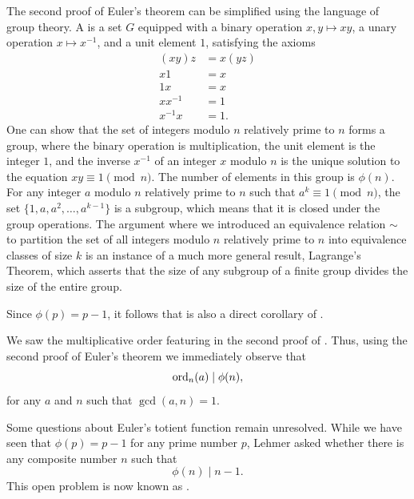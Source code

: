 \begin{remark}
  The second proof of Euler's theorem can be simplified using the language of group theory. A  is a set $G$ equipped with a binary operation $x,y\mapsto xy$, a unary operation $x\mapsto x^{-1}$, and a unit element $1$, satisfying the axioms
  \begin{align*}
    (xy)z & = x(yz) \\
    x1 & = x \\
    1x & = x \\
    xx^{-1} & = 1 \\
    x^{-1}x & = 1.
  \end{align*}
  One can show that the set of integers modulo $n$ relatively prime to $n$ forms a group, where the binary operation is multiplication, the unit element is the integer $1$, and the inverse $x^{-1}$ of an integer $x$ modulo $n$ is the unique solution to the equation $xy\equiv 1\pmod{n}$. The number of elements in this group is $\phi(n)$. For any integer $a$ modulo $n$ relatively prime to $n$ such that $a^k\equiv 1\pmod{n}$, the set $\{1,a,a^2,\ldots,a^{k-1}\}$ is a subgroup, which means that it is closed under the group operations. The argument where we introduced an equivalence relation $\sim$ to partition the set of all integers modulo $n$ relatively prime to $n$ into equivalence classes of size $k$ is an instance of a much more general result, Lagrange's Theorem, which asserts that the size of any subgroup of a finite group divides the size of the entire group.
\end{remark}

Since $\phi(p)=p-1$, it follows that  is also a direct corollary of .

\begin{remark}
  We saw the multiplicative order featuring in the second proof of . Thus, using the second proof of Euler's theorem we immediately observe that
  \begin{equation*}
    \operatorname{ord}_n(a)\mid \phi(n),
  \end{equation*}
  for any $a$ and $n$ such that $\gcd(a,n)=1$.
\end{remark}

Some questions about Euler's totient function remain unresolved. While we have seen that $\phi(p)=p-1$ for any prime number $p$, Lehmer asked whether there is any composite number $n$ such that
\begin{equation*}
  \phi(n)\mid n-1.
\end{equation*}
This open problem is now known as  \cite{lehmer1933}.

